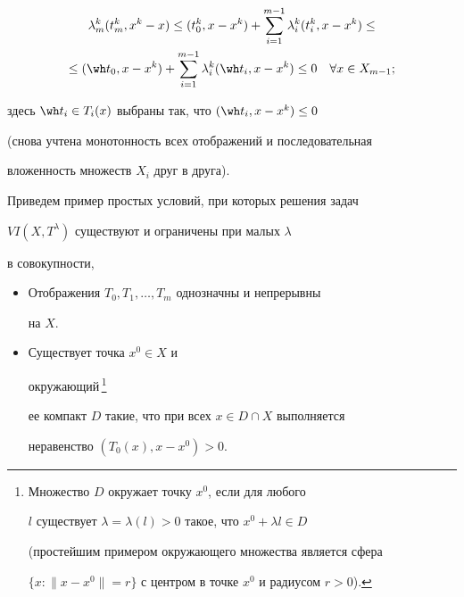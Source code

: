 \begin{pf}
\begin{multline*}
\lambda_m^k(t_m^k, x^k-x)\le (t_0^k, x-x^k)+ \sum^{m-1}_{i=1}


\lambda_i^k (t_i^k, x- x^k) \le \\


%


\le (\wh t_0,


x-x^k)+\sum^{m-1}_{i=1} \lambda_i^k (\wh t_i, x-x^k) \le 0


\quad \forall x\in X_{m-1};


\end{multline*}


здесь $\wh t_i\in T_i(x)$ выбраны так, что $(\wh t_i, x-x^k)\le 0$


(снова учтена монотонность всех отображений и последовательная


вложенность множеств $X_i$ друг в друга).


\end{pf}





Приведем пример простых условий, при которых решения задач


$VI (X,T^{\lambda})$ существуют и ограничены при малых $\lambda$


в совокупности,





\begin{itemize}


\item[A6.] Отображения $T_0, T_1, \dotsc, T_m$ однозначны и непрерывны


на $X$.


\item[A7.] Существует точка $x^0\in X$ и


окружающий\,\footnote{Множество $D$ окружает точку $x^0$, если для любого


$l$ существует $\lambda=\lambda(l) >0$ такое, что $x^0+\lambda l\in D$


(простейшим примером окружающего множества является сфера


$\{x : \| x-x^0\|=r\}$ с центром в точке $x^0$ и радиусом $r>0$).}


ее компакт $D$ такие, что при всех $x\in D\cap X$ выполняется


неравенство $(T_0(x), x-x^0)> 0$.


\end{itemize}


\addtocounter{footnote}{-1}





